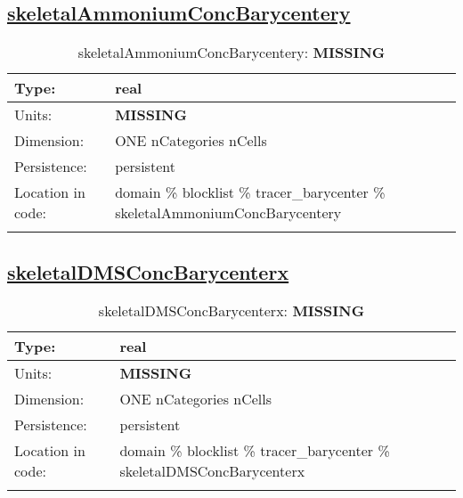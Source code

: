 \subsection[skeletalAmmoniumConcBarycentery]{\hyperref[sec:var_tab_tracer_barycenter]{skeletalAmmoniumConcBarycentery}}
\label{subsec:var_sec_tracer_barycenter_skeletalAmmoniumConcBarycentery}
\begin{center}
\begin{longtable}{| p{2.0in} | p{4.0in} |}
        \hline 
        Type: & real \\
        \hline 
        Units: & {\bf \color{red} MISSING} \\
        \hline 
        Dimension: & ONE nCategories nCells \\
        \hline 
        Persistence: & persistent \\
        \hline 
         Location in code: & domain \% blocklist \% tracer\_barycenter \% skeletalAmmoniumConcBarycentery \\
         \hline 
    \caption{skeletalAmmoniumConcBarycentery: {\bf \color{red} MISSING}}
\end{longtable}
\end{center}
\subsection[skeletalDMSConcBarycenterx]{\hyperref[sec:var_tab_tracer_barycenter]{skeletalDMSConcBarycenterx}}
\label{subsec:var_sec_tracer_barycenter_skeletalDMSConcBarycenterx}
\begin{center}
\begin{longtable}{| p{2.0in} | p{4.0in} |}
        \hline 
        Type: & real \\
        \hline 
        Units: & {\bf \color{red} MISSING} \\
        \hline 
        Dimension: & ONE nCategories nCells \\
        \hline 
        Persistence: & persistent \\
        \hline 
         Location in code: & domain \% blocklist \% tracer\_barycenter \% skeletalDMSConcBarycenterx \\
         \hline 
    \caption{skeletalDMSConcBarycenterx: {\bf \color{red} MISSING}}
\end{longtable}
\end{center}
